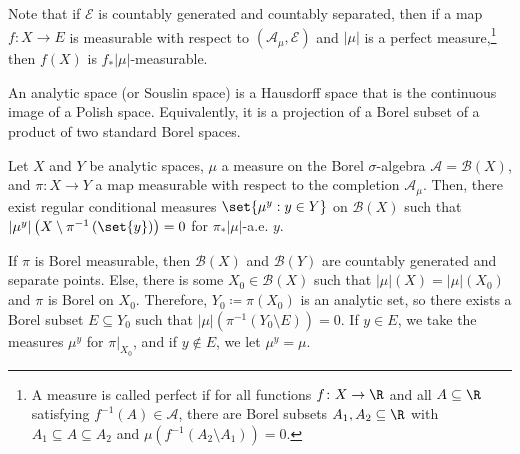 \documentclass[10pt]{mypackage}
\renewcommand{\coloneq}{\coloneqq}
\begin{document}
Note that if $\mathcal{E}$ is countably generated and countably separated, then if a map $f\colon X\to E$ is measurable with respect to $\left( \mathcal{A}_{\mu},\mathcal{E} \right)$ and $\left\vert \mu \right\vert$ is a perfect measure,\footnote{A measure is called perfect if for all functions $f\colon X\to \R$ and all $A\subseteq \R$ satisfying $f^{-1}(A)\in \mathcal{A}$, there are Borel subsets $A_1,A_2\subseteq \R$ with $A_1\subseteq A\subseteq A_2$ and $\mu\left( f^{-1}\left( A_2\setminus A_1 \right) \right) = 0$.} then $f(X)$ is $f_{\ast}\left\vert \mu \right\vert$-measurable.

An analytic space (or Souslin space) is a Hausdorff space that is the continuous image of a Polish space. Equivalently, it is a projection of a Borel subset of a product of two standard Borel spaces.
\begin{example}
  Let $X$ and $Y$ be analytic spaces, $\mu$ a measure on the Borel $\sigma$-algebra $\mathcal{A} = \mathcal{B}\left( X \right)$, and $\pi\colon X\to Y$ a map measurable with respect to the completion $\mathcal{A}_{\mu}$. Then, there exist regular conditional measures $\set{\mu^y : y\in Y}$ on $\mathcal{B}\left( X \right)$ such that $\left\vert \mu^y \right\vert\left( X\setminus \pi^{-1}\left( \set{y} \right) \right)=0$ for $\pi_{\ast}\left\vert \mu \right\vert$-a.e. $y$.

  If $\pi$ is Borel measurable, then $\mathcal{B}\left( X \right)$ and $\mathcal{B}\left( Y \right)$ are countably generated and separate points. Else, there is some $X_0\in \mathcal{B}\left( X \right)$ such that $\left\vert \mu \right\vert\left( X \right) = \left\vert \mu \right\vert\left( X_0 \right)$ and $\pi$ is Borel on $X_0$. Therefore, $Y_0\coloneq \pi\left( X_0 \right)$ is an analytic set, so there exists a Borel subset $E\subseteq Y_0$ such that $\left\vert \mu \right\vert\left( \pi^{-1}\left( Y_0\setminus E \right) \right) = 0$. If $y\in E$, we take the measures $\mu^y$ for $\pi|_{X_0}$, and if $y\notin E$, we let $\mu^y = \mu$.
\end{example}
\end{document}
